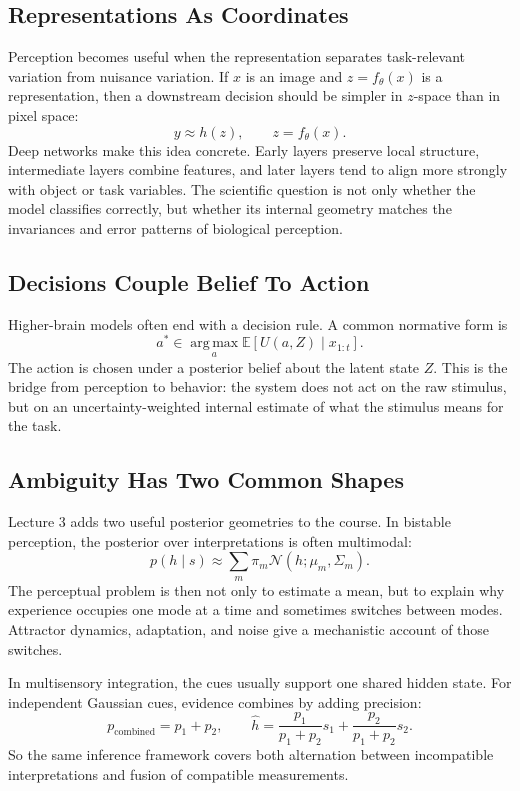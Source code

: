 \subsection{Representations As Coordinates}

Perception becomes useful when the representation separates task-relevant variation from nuisance variation. If \(x\) is an image and \(z=f_\theta(x)\) is a representation, then a downstream decision should be simpler in \(z\)-space than in pixel space:
\[
  y \approx h(z),
  \qquad
  z=f_\theta(x).
\]
Deep networks make this idea concrete. Early layers preserve local structure, intermediate layers combine features, and later layers tend to align more strongly with object or task variables. The scientific question is not only whether the model classifies correctly, but whether its internal geometry matches the invariances and error patterns of biological perception.

\subsection{Decisions Couple Belief To Action}

Higher-brain models often end with a decision rule. A common normative form is
\[
  a^\ast
  \in
  \operatorname*{arg\,max}_a
  \mathbb{E}\!\left[U(a,Z)\mid x_{1:t}\right].
\]
The action is chosen under a posterior belief about the latent state \(Z\). This is the bridge from perception to behavior: the system does not act on the raw stimulus, but on an uncertainty-weighted internal estimate of what the stimulus means for the task.

\subsection{Ambiguity Has Two Common Shapes}

Lecture 3 adds two useful posterior geometries to the course. In bistable perception, the posterior over interpretations is often multimodal:
\[
  p(h\mid s)
  \approx
  \sum_m \pi_m \mathcal N(h;\mu_m,\Sigma_m).
\]
The perceptual problem is then not only to estimate a mean, but to explain why experience occupies one mode at a time and sometimes switches between modes. Attractor dynamics, adaptation, and noise give a mechanistic account of those switches.

In multisensory integration, the cues usually support one shared hidden state. For independent Gaussian cues, evidence combines by adding precision:
\[
  p_{\mathrm{combined}} = p_1+p_2,
  \qquad
  \hat h =
  \frac{p_1}{p_1+p_2}s_1+
  \frac{p_2}{p_1+p_2}s_2.
\]
So the same inference framework covers both alternation between incompatible interpretations and fusion of compatible measurements.
